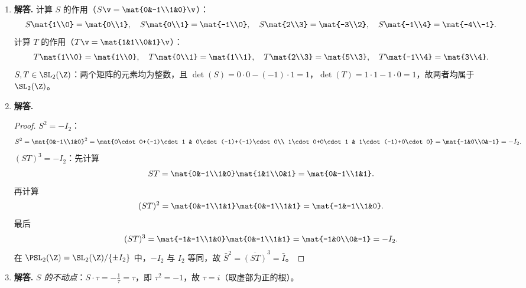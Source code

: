 \begin{enumerate}[label=\textbf{\arabic*.}, leftmargin=*, itemsep=1em]
  \item \textbf{解答.}
  计算 $S$ 的作用（$S\v=\mat{0&-1\\1&0}\v$）：
  \[
    S\mat{1\\0}=\mat{0\\1},\quad S\mat{0\\1}=\mat{-1\\0},\quad
    S\mat{2\\3}=\mat{-3\\2},\quad S\mat{-1\\4}=\mat{-4\\-1}.
  \]
  计算 $T$ 的作用（$T\v=\mat{1&1\\0&1}\v$）：
  \[
    T\mat{1\\0}=\mat{1\\0},\quad T\mat{0\\1}=\mat{1\\1},\quad
    T\mat{2\\3}=\mat{5\\3},\quad T\mat{-1\\4}=\mat{3\\4}.
  \]
  $S,T\in\SL_2(\Z)$：两个矩阵的元素均为整数，且
  $\det(S)=0\cdot0-(-1)\cdot1=1$，$\det(T)=1\cdot1-1\cdot0=1$，故两者均属于 $\SL_2(\Z)$。

  \item \textbf{解答.}
  \begin{proof}
  \emph{$S^2=-I_2$}：
  \[
    S^2=\mat{0&-1\\1&0}^2=\mat{0\cdot0+(-1)\cdot1 & 0\cdot(-1)+(-1)\cdot0\\
                                  1\cdot0+0\cdot1   & 1\cdot(-1)+0\cdot0}
       =\mat{-1&0\\0&-1}=-I_2.
  \]
  \emph{$(ST)^3=-I_2$}：先计算
  \[
    ST=\mat{0&-1\\1&0}\mat{1&1\\0&1}=\mat{0&-1\\1&1}.
  \]
  再计算
  \[
    (ST)^2=\mat{0&-1\\1&1}\mat{0&-1\\1&1}=\mat{-1&-1\\1&0}.
  \]
  最后
  \[
    (ST)^3=\mat{-1&-1\\1&0}\mat{0&-1\\1&1}=\mat{-1&0\\0&-1}=-I_2.
  \]
  在 $\PSL_2(\Z)=\SL_2(\Z)/\{\pm I_2\}$ 中，$-I_2$ 与 $I_2$ 等同，故 $\bar S^2=\overline{(ST)}^3=\bar I$。
  \end{proof}

  \item \textbf{解答.}
  \emph{$S$ 的不动点}：$S\cdot\tau=-\tfrac{1}{\tau}=\tau$，即 $\tau^2=-1$，故 $\tau=i$（取虚部为正的根）。


\end{enumerate}
